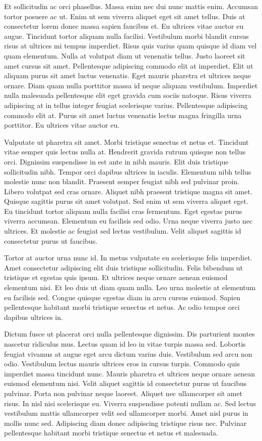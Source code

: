 \documentclass[a4paper,12pt,oneside]{article}
\begin{document}
Et sollicitudin ac orci phasellus. Massa enim nec dui nunc mattis enim. Accumsan tortor posuere ac ut. Enim ut sem viverra aliquet eget sit amet tellus. Duis at consectetur lorem donec massa sapien faucibus et. Eu ultrices vitae auctor eu augue. Tincidunt tortor aliquam nulla facilisi. Vestibulum morbi blandit cursus risus at ultrices mi tempus imperdiet. Risus quis varius quam quisque id diam vel quam elementum. Nulla at volutpat diam ut venenatis tellus. Justo laoreet sit amet cursus sit amet. Pellentesque adipiscing commodo elit at imperdiet. Elit ut aliquam purus sit amet luctus venenatis. Eget mauris pharetra et ultrices neque ornare. Diam quam nulla porttitor massa id neque aliquam vestibulum. Imperdiet nulla malesuada pellentesque elit eget gravida cum sociis natoque. Risus viverra adipiscing at in tellus integer feugiat scelerisque varius. Pellentesque adipiscing commodo elit at. Purus sit amet luctus venenatis lectus magna fringilla urna porttitor. Eu ultrices vitae auctor eu.

Vulputate ut pharetra sit amet. Morbi tristique senectus et netus et. Tincidunt vitae semper quis lectus nulla at. Hendrerit gravida rutrum quisque non tellus orci. Dignissim suspendisse in est ante in nibh mauris. Elit duis tristique sollicitudin nibh. Tempor orci dapibus ultrices in iaculis. Elementum nibh tellus molestie nunc non blandit. Praesent semper feugiat nibh sed pulvinar proin. Libero volutpat sed cras ornare. Aliquet nibh praesent tristique magna sit amet. Quisque sagittis purus sit amet volutpat. Sed enim ut sem viverra aliquet eget. Eu tincidunt tortor aliquam nulla facilisi cras fermentum. Eget egestas purus viverra accumsan. Elementum eu facilisis sed odio. Urna neque viverra justo nec ultrices. Et molestie ac feugiat sed lectus vestibulum. Velit aliquet sagittis id consectetur purus ut faucibus.

Tortor at auctor urna nunc id. In metus vulputate eu scelerisque felis imperdiet. Amet consectetur adipiscing elit duis tristique sollicitudin. Felis bibendum ut tristique et egestas quis ipsum. Et ultrices neque ornare aenean euismod elementum nisi. Et leo duis ut diam quam nulla. Leo urna molestie at elementum eu facilisis sed. Congue quisque egestas diam in arcu cursus euismod. Sapien pellentesque habitant morbi tristique senectus et netus. Ac odio tempor orci dapibus ultrices in.

Dictum fusce ut placerat orci nulla pellentesque dignissim. Dis parturient montes nascetur ridiculus mus. Lectus quam id leo in vitae turpis massa sed. Lobortis feugiat vivamus at augue eget arcu dictum varius duis. Vestibulum sed arcu non odio. Vestibulum lectus mauris ultrices eros in cursus turpis. Commodo quis imperdiet massa tincidunt nunc. Mauris pharetra et ultrices neque ornare aenean euismod elementum nisi. Velit aliquet sagittis id consectetur purus ut faucibus pulvinar. Porta non pulvinar neque laoreet. Aliquet nec ullamcorper sit amet risus. In nisl nisi scelerisque eu. Viverra suspendisse potenti nullam ac. Sed lectus vestibulum mattis ullamcorper velit sed ullamcorper morbi. Amet nisl purus in mollis nunc sed. Adipiscing diam donec adipiscing tristique risus nec. Pulvinar pellentesque habitant morbi tristique senectus et netus et malesuada.
\end{document}
